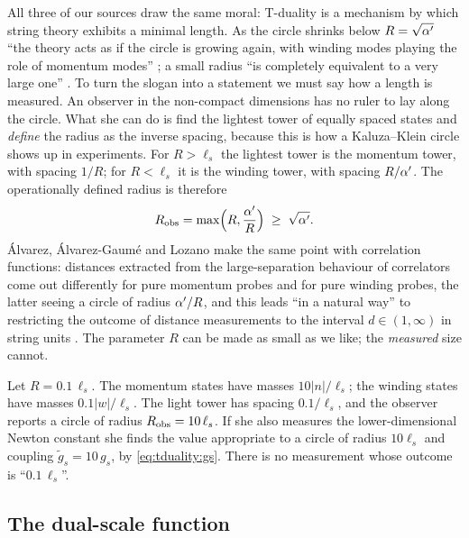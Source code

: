 All three of our sources draw the same moral: T-duality is a mechanism by which string theory
exhibits a minimal length. As the circle shrinks below $R=\sqrt{\alpha'}$ ``the
theory acts as if the circle is growing again, with winding modes playing the role of momentum
modes'' ; a small radius ``is completely equivalent to a very
large one'' . To turn the slogan into a statement we must say how a
length is measured. An observer in the non-compact dimensions has no ruler to lay along the
circle. What she can do is find the lightest tower of equally spaced states and \emph{define}
the radius as the inverse spacing, because this is how a Kaluza--Klein circle shows up in
experiments. For $R>\ell_s$ the lightest tower is the momentum tower, with spacing $1/R$; for
$R<\ell_s$ it is the winding tower, with spacing $R/\alpha'$. The operationally defined radius is
therefore
\begin{equation}\label{eq:tduality:Robs}
  R_{\rm obs}=\max\!\Big(R,\frac{\alpha'}{R}\Big)\;\ge\;\sqrt{\alpha'}.
\end{equation}
\'Alvarez, \'Alvarez-Gaum\'e and Lozano make the same point with correlation functions:
distances extracted from the large-separation behaviour of correlators come out differently
for pure momentum probes and for pure winding probes, the latter seeing a circle of radius
$\alpha'/R$, and this leads ``in a natural way'' to restricting the outcome of distance measurements
to the interval $d\in(1,\infty)$ in string units . The
parameter $R$ can be made as small as we like; the \emph{measured} size cannot.

\begin{example}
Let $R=0.1\,\ell_s$. The momentum states have masses $10|n|/\ell_s$; the winding states have
masses $0.1|w|/\ell_s$. The light tower has spacing $0.1/\ell_s$, and the observer reports a circle
of radius $R_{\rm obs}=10\,\ell_s$. If she also measures the lower-dimensional Newton constant she
finds the value appropriate to a circle of radius $10\ell_s$ and coupling $\tilde g_s=10\,g_s$,
by \eqref{eq:tduality:gs}. There is no measurement whose outcome is ``$0.1\,\ell_s$''.
\end{example}

\subsection{The dual-scale function}

